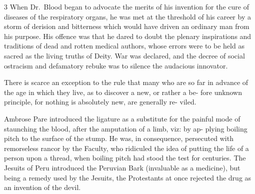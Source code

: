 \documentclass[10pt]{article}
\begin{document}
\begin{multicols}{3}
	When Dr.~Blood began to advocate the merits of his invention for the\linebreak
	cure of diseases of the respiratory organs, he was met at the threshold of his\linebreak
	career by a storm of derision and bitterness which would have driven an\linebreak
	ordinary man from his purpose. His offence was that he dared to doubt\linebreak
	the plenary inspirations and traditions of dead and rotten medical authors,\linebreak
	whose errors were to be held as sacred as the living truths of Deity. War\linebreak
	was declared, and the decree of social ostracism and defamatory rebuke was\linebreak
	to silence the audacious innovator.\columnbreak

	There is scarce an exception to the rule that many who are so far in\linebreak
	advance of the age in which they live, as to discover a new, or rather a be-\linebreak
	fore unknown principle, for nothing is absolutely new, are generally re-\linebreak
	viled.

	Ambrose Pare introduced the ligature as a substitute for the painful\linebreak
	mode of staunching the blood, after the amputation of a limb, viz: by ap-\linebreak
	plying boiling pitch to the surface of the stump. He was, in consequence,\linebreak
	persecuted with remorseless rancor by the Faculty, who ridiculed the idea\linebreak
	of putting the life of a person upon a thread, when boiling pitch had stood\linebreak
	the test for centuries. The Jesuits of Peru introduced the Peruvian\linebreak
	Bark (invaluable as a medicine), but being a remedy used by the Jesuits,\linebreak
	the Protestants at once rejected the drug as an invention of the devil.

	\vspace{5mm}


\end{multicols}
\end{document}
